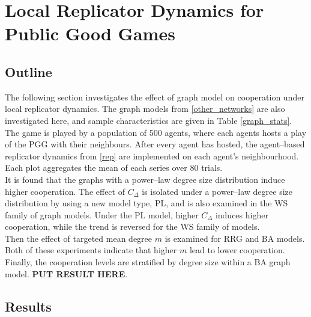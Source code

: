 \section{Local Replicator Dynamics for Public Good Games}
\subsection{Outline}
The following section investigates the effect of graph model on cooperation under local replicator dynamics. The graph models from \ref{other_networks} are also investigated here, and sample characteristics are given in Table \ref{graph_stats}. The game is played by a population of 500 agents, where each agents hosts a play of the PGG with their neighbours. After every agent has hosted, the agent--based replicator dynamics from \eqref{rep} are implemented on each agent's neighbourhood. Each plot aggregates the mean of each series over 80 trials.  \\
It is found that the graphs with a power--law degree size distribution induce higher cooperation. The effect of $C_\Delta$ is isolated under a power--law degree size distribution by using a new model type, PL, and is also examined in the WS family of graph models. Under the PL model, higher $C_\Delta$ induces higher cooperation, while the trend is reversed for the WS family of models. \\

Then the effect of targeted mean degree $m$ is examined for RRG and BA models. Both of these experiments indicate that higher $m$ lead to lower cooperation. Finally, the cooperation levels are stratified by degree size within a BA graph model. \textbf{PUT RESULT HERE}. 
\subsection{Results}



